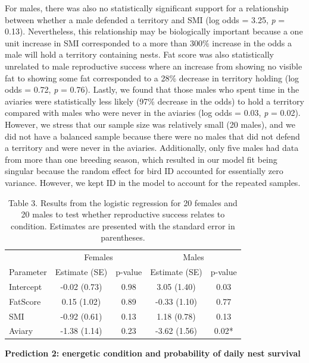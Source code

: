 \documentclass[
]{article}
\begin{document}
For males, there was also no statistically significant support for a
relationship between whether a male defended a territory and SMI (log
odds = 3.25, \emph{p} = 0.13). Nevertheless, this relationship may be
biologically important because a one unit increase in SMI corresponded
to a more than 300\% increase in the odds a male will hold a territory
containing nests. Fat score was also statistically unrelated to male
reproductive success where an increase from showing no visible fat to
showing some fat corresponded to a 28\% decrease in territory holding
(log odds = 0.72, \emph{p} = 0.76). Lastly, we found that those males
who spent time in the aviaries were statistically less likely (97\%
decrease in the odds) to hold a territory compared with males who were
never in the aviaries (log odds = 0.03, \emph{p} = 0.02). However, we
stress that our sample size was relatively small (20 males), and we did
not have a balanced sample because there were no males that did not
defend a territory and were never in the aviaries. Additionally, only
five males had data from more than one breeding season, which resulted
in our model fit being singular because the random effect for bird ID
accounted for essentially zero variance. However, we kept ID in the
model to account for the repeated samples.

\begin{table}

\caption{\label{tab:p2 main results}Table 3. Results from the logistic regression for 20 females and 20 males to test whether reproductive success relates to condition. Estimates are presented with the standard error in parentheses.}
\centering
\begin{tabular}[t]{l|c|c|c|c}
\hline
\multicolumn{1}{c|}{ } & \multicolumn{2}{c|}{Females} & \multicolumn{2}{c}{Males} \\
\cline{2-3} \cline{4-5}
Parameter & Estimate (SE) & p-value & Estimate (SE) & p-value\\
\hline
Intercept & -0.02 (0.73) & 0.98 & 3.05 (1.40) & 0.03\\
\hline
FatScore & 0.15 (1.02) & 0.89 & -0.33 (1.10) & 0.77\\
\hline
SMI & -0.92 (0.61) & 0.13 & 1.18 (0.78) & 0.13\\
\hline
Aviary & -1.38 (1.14) & 0.23 & -3.62 (1.56) & 0.02*\\
\hline
\end{tabular}
\end{table}

\textbf{Prediction 2: energetic condition and probability of daily nest
survival}
\end{document}
